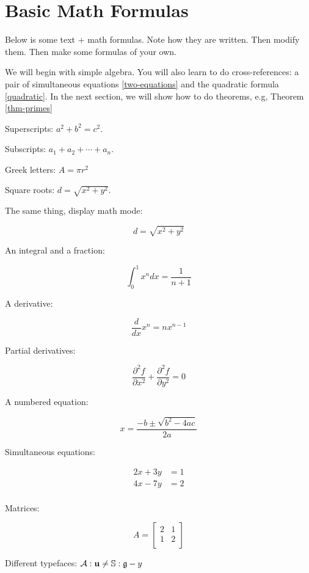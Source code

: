 \section{Basic Math Formulas}

Below is some text + math formulas. Note how they are written.  Then modify them.  Then make some formulas of your own.

We will begin with simple algebra. You will also learn to do cross-references: a pair of simultaneous equations \eqref{two-equations} and the quadratic formula \eqref{quadratic}.  In the next section, we will show how to do theorems, e.g, Theorem \eqref{thm-primes}

Superscripts: $a^2 + b^2 = c^2$.

Subscripts: $a_1 + a_2 + \cdots + a_n$. 

Greek letters: $A = \pi r^2$

Square roots: $d = \sqrt{x^2 + y^2}$.

The same thing, display math mode:

$$
d = \sqrt{x^2 + y^2}
$$

An integral and a fraction:

$$
\int_0^1 x^n dx = \frac{1}{n+1}
$$

A derivative:

$$
   \frac{d}{dx} x^n = n x^{n-1}
$$

Partial derivatives:

$$
\frac{\partial^2 f}{\partial x^2} + \frac{\partial^2 f}{\partial y^2}  = 0
$$

A numbered equation:

\begin{equation}
\label{quadratic}
x = \frac{- b \pm \sqrt{b^2 - 4ac}}{2a}
\end{equation}

Simultaneous equations:

\begin{align}
\label{two-equations}
2x + 3y &= 1 \\
4x - 7y &= 2 \\
\end{align}

Matrices:

$$
A =
\begin{bmatrix}
2 & 1 \\
1 & 2 \\
\end{bmatrix}
$$

Different typefaces: $\mathcal{A}:{\bf u} \not= \mathbb{S}:{\frak g} - y$

